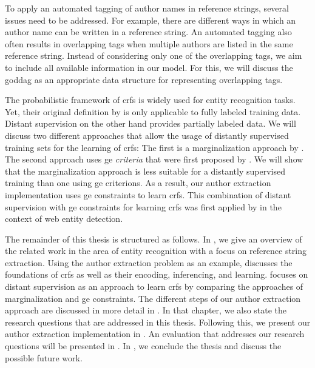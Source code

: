 To apply an automated tagging of author names in reference strings, several issues need to be addressed.
For example, there are different ways in which an author name can be written in a reference string.
An automated tagging also often results in overlapping tags when multiple authors are listed in the same reference string.
Instead of considering only one of the overlapping tags, we aim to include all available information in our model.
For this, we will discuss the \gls{goddag} as an appropriate data structure for representing overlapping tags.

The probabilistic framework of \glspl{crf} is widely used for entity recognition tasks.
Yet, their original definition by \citet{lafferty2001conditional} is only applicable to fully labeled training data.
Distant supervision on the other hand provides partially labeled data.
We will discuss two different approaches that allow the usage of distantly supervised training sets for the learning of \glspl{crf}:
The first is a marginalization approach by \citet{tsuboi2008training}.
The second approach uses \gls{ge} \textit{criteria} that were first proposed by \citet{mann2007simple}.
We will show that the marginalization approach is less suitable for a distantly supervised training than one using \glspl{ge criterion}.
As a result, our author extraction implementation uses \glspl{ge constraint} to learn \glspl{crf}.
This combination of distant supervision with \glspl{ge constraint} for learning \glspl{crf} was first applied by \citet{lu2013web} in the context of web entity detection.

\bigskip

The remainder of this thesis is structured as follows.
In , we give an overview of the related work in the area of entity recognition with a focus on reference string extraction.
Using the author extraction problem as an example,  discusses the foundations of \glspl{crf} as well as their encoding, inferencing, and learning.
 focuses on distant supervision as an approach to learn \glspl{crf} by comparing the approaches of marginalization and \gls{ge} constraints.
The different steps of our author extraction approach are discussed in more detail in .
In that chapter, we also state the research questions that are addressed in this thesis.
Following this, we present our author extraction implementation in .
An evaluation that addresses our research questions will be presented in .
In , we conclude the thesis and discuss the possible future work.

